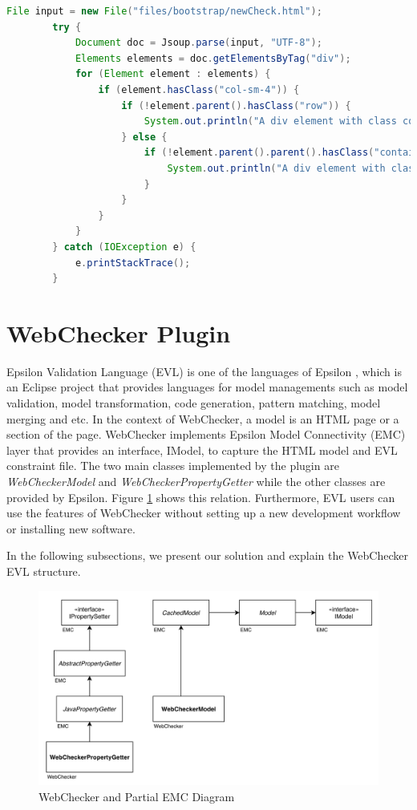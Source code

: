 \documentclass[conference]{IEEETran}
\begin{document}
\begin{lstlisting}[language=Java, caption=Enforcing Bootstrap Grid Rule, label={lst:ebgr}]
		File input = new File("files/bootstrap/newCheck.html");
		try {
			Document doc = Jsoup.parse(input, "UTF-8");
			Elements elements = doc.getElementsByTag("div");
			for (Element element : elements) {
				if (element.hasClass("col-sm-4")) {					
					if (!element.parent().hasClass("row")) {
						System.out.println("A div element with class col should have a parent element with class row");
					} else {
						if (!element.parent().parent().hasClass("container")) {
							System.out.println("A div element with class col should have a parent element with class row, which has a parent with class container.");
						}
					}
				}
			}		
		} catch (IOException e) {
			e.printStackTrace();
		}
\end{lstlisting}


\section{WebChecker Plugin}
Epsilon Validation Language (EVL) \cite{Kolovos2009} is one of the languages of Epsilon \cite{EpsilonProject}, which is an Eclipse project that provides languages for model managements such as model validation, model transformation, code generation, pattern matching, model merging and etc. In the context of WebChecker, a model is an HTML page or a section of the page. WebChecker implements Epsilon Model Connectivity (EMC) layer that provides an interface, IModel, to capture the HTML model and EVL constraint file. The two main classes implemented by the plugin are \textit{WebCheckerModel} and \textit{WebCheckerPropertyGetter} while the other classes are provided by Epsilon. Figure \ref{fig:webcheckerclass} shows this relation. Furthermore, EVL users can use the features of WebChecker without setting up a new development workflow or installing new software.  

In the following subsections, we present our solution and explain the WebChecker EVL structure.  


\begin{figure}
  \includegraphics[width=\linewidth]{figures/webchecker-class.png}
  \caption{WebChecker and Partial EMC Diagram}
  \label{fig:webcheckerclass}
\end{figure}
\end{document}
